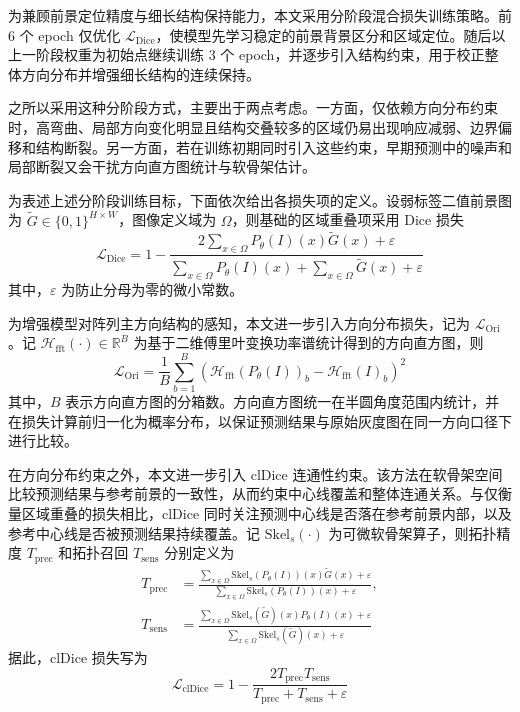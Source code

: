 为兼顾前景定位精度与细长结构保持能力，本文采用分阶段混合损失训练策略。前 6 个 epoch 仅优化 $\mathcal{L}_{\mathrm{Dice}}$，使模型先学习稳定的前景背景区分和区域定位。随后以上一阶段权重为初始点继续训练 3 个 epoch，并逐步引入结构约束，用于校正整体方向分布并增强细长结构的连续保持。

之所以采用这种分阶段方式，主要出于两点考虑。一方面，仅依赖方向分布约束时，高弯曲、局部方向变化明显且结构交叠较多的区域仍易出现响应减弱、边界偏移和结构断裂。另一方面，若在训练初期同时引入这些约束，早期预测中的噪声和局部断裂又会干扰方向直方图统计与软骨架估计。

为表述上述分阶段训练目标，下面依次给出各损失项的定义。设弱标签二值前景图为 $\tilde{G}\in\{0,1\}^{H\times W}$，图像定义域为 $\Omega$，则基础的区域重叠项采用 Dice 损失\cite{Milletari2016VNet}
\begin{equation}
    \mathcal{L}_{\mathrm{Dice}}=
    1-\frac{2\sum_{x\in\Omega}P_{\theta}(I)(x)\tilde{G}(x)+\varepsilon}
    {\sum_{x\in\Omega}P_{\theta}(I)(x)+\sum_{x\in\Omega}\tilde{G}(x)+\varepsilon}
\end{equation}
其中，$\varepsilon$ 为防止分母为零的微小常数。

为增强模型对阵列主方向结构的感知，本文进一步引入方向分布损失，记为 $\mathcal{L}_{\mathrm{Ori}}$。记 $\mathcal{H}_{\mathrm{fft}}(\cdot)\in\mathbb{R}^{B}$ 为基于二维傅里叶变换功率谱统计得到的方向直方图，则
\begin{equation}
    \mathcal{L}_{\mathrm{Ori}}=
    \frac{1}{B}\sum_{b=1}^{B}
    \left(
    \mathcal{H}_{\mathrm{fft}}\!\left(P_{\theta}(I)\right)_{b}
    -
    \mathcal{H}_{\mathrm{fft}}(I)_{b}
    \right)^2
\end{equation}
其中，$B$ 表示方向直方图的分箱数。方向直方图统一在半圆角度范围内统计，并在损失计算前归一化为概率分布，以保证预测结果与原始灰度图在同一方向口径下进行比较。

在方向分布约束之外，本文进一步引入 clDice 连通性约束\cite{Shit2021clDice}。该方法在软骨架空间比较预测结果与参考前景的一致性，从而约束中心线覆盖和整体连通关系。与仅衡量区域重叠的损失相比，clDice 同时关注预测中心线是否落在参考前景内部，以及参考中心线是否被预测结果持续覆盖。记 $\mathrm{Skel}_{s}(\cdot)$ 为可微软骨架算子，则拓扑精度 $T_{\mathrm{prec}}$ 和拓扑召回 $T_{\mathrm{sens}}$ 分别定义为
\begin{equation}
    \begin{aligned}
        T_{\mathrm{prec}}&=
        \frac{\sum_{x\in\Omega}\mathrm{Skel}_{s}\!\left(P_{\theta}(I)\right)(x)\tilde{G}(x)+\varepsilon}
        {\sum_{x\in\Omega}\mathrm{Skel}_{s}\!\left(P_{\theta}(I)\right)(x)+\varepsilon},\\
        T_{\mathrm{sens}}&=
        \frac{\sum_{x\in\Omega}\mathrm{Skel}_{s}(\tilde{G})(x)P_{\theta}(I)(x)+\varepsilon}
        {\sum_{x\in\Omega}\mathrm{Skel}_{s}(\tilde{G})(x)+\varepsilon}
    \end{aligned}
\end{equation}
据此，clDice 损失写为
\begin{equation}
    \mathcal{L}_{\mathrm{clDice}}=
    1-\frac{2T_{\mathrm{prec}}T_{\mathrm{sens}}}
    {T_{\mathrm{prec}}+T_{\mathrm{sens}}+\varepsilon}
    \label{eq:4_cldice_loss}
\end{equation}

